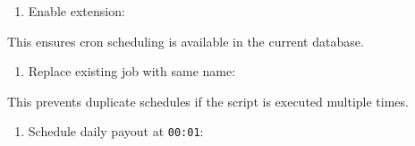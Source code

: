 \begin{enumerate}
\def\labelenumi{\arabic{enumi}.}
\tightlist
\item
  Enable extension:
\end{enumerate}

\begin{Shaded}
\begin{Highlighting}[]
  
\end{Highlighting}
\end{Shaded}

This ensures cron scheduling is available in the current database.

\begin{enumerate}
\def\labelenumi{\arabic{enumi}.}
\setcounter{enumi}{1}
\tightlist
\item
  Replace existing job with same name:
\end{enumerate}

\begin{Shaded}
\begin{Highlighting}[]
\NormalTok{;}
    \OperatorTok{=} \NormalTok{;}

       
     \NormalTok{;}
\NormalTok{ $$;}
\end{Highlighting}
\end{Shaded}

This prevents duplicate schedules if the script is executed multiple
times.

\begin{enumerate}
\def\labelenumi{\arabic{enumi}.}
\setcounter{enumi}{2}
\tightlist
\item
  Schedule daily payout at \texttt{00:01}:
\end{enumerate}

